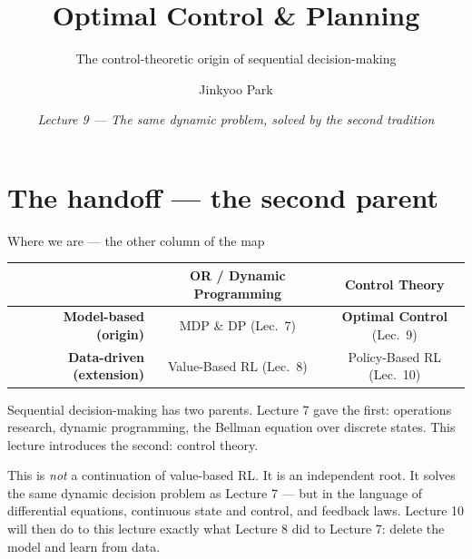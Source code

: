 \documentclass[10pt, aspectratio=169]{beamer}
\title{Optimal Control \& Planning}
\subtitle{The control-theoretic origin of sequential decision-making}
\author{Jinkyoo Park}
\institute{KAIST}
\date{\textit{Lecture 9 --- The same dynamic problem, solved by the second tradition}}
\begin{document}

\maketitle

\section{The handoff --- the second parent}

\begin{frame}{Where we are --- the other column of the map}
\vspace{2pt}
\begin{center}\footnotesize
\renewcommand{\arraystretch}{1.35}
\begin{tabular}{r|c|c}
 & \textbf{OR / Dynamic Programming} & \textbf{Control Theory} \\
\hline
\textbf{Model-based (origin)}  & MDP \& DP \scriptsize(Lec.\ 7) & \cellcolor{mDarkTeal!20}\textbf{Optimal Control} \scriptsize(\alert{Lec.\ 9})\\
\hline
\textbf{Data-driven (extension)} & Value-Based RL \scriptsize(Lec.\ 8) & Policy-Based RL \scriptsize(Lec.\ 10)\\
\end{tabular}
\end{center}
\smallskip

Sequential decision-making has \alert{two parents}. Lecture 7 gave the first: operations research, dynamic programming, the Bellman equation over discrete states. This lecture introduces the second: \alert{control theory}.
\smallskip

\pause
This is \emph{not} a continuation of value-based RL. It is an independent root. It solves the \alert{same dynamic decision problem} as Lecture 7 --- but in the language of differential equations, continuous state and control, and feedback laws. Lecture 10 will then do to this lecture exactly what Lecture 8 did to Lecture 7: \alert{delete the model and learn from data}.
\end{frame}
\end{document}
